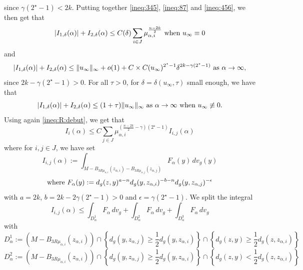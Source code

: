 \documentclass[reqno]{amsart}
\def \eps {\epsilon}
\def \crit {2^\star}
\def \mai {\mu_{\alpha,i}}
\def \maj {\mu_{\alpha,j}}
\def \zai {z_{\alpha,i}}
\def \zaj {z_{\alpha,j}}
\begin{document}
since $\gamma(\crit-1)<2k$. Putting together \eqref{ineq:345}, \eqref{ineq:87} and \eqref{ineq:456}, we then get that
\begin{equation}\label{ineq:sup:1}
\left|I_{1,\delta}(\alpha)\right|+I_{2,\delta}(\alpha)\leq C(\delta) \sum_{i\in J}\mai^{\frac{n-2k}{2}}\hbox{ when }u_\infty\equiv 0
\end{equation}
and 
\begin{equation*}
\left|I_{1,\delta}(\alpha)\right|+I_{2,\delta}(\alpha)\leq \Vert u_\infty\Vert_\infty+o(1)+C\times C( u_\infty )^{\crit-1}  \delta^{2k-\gamma(\crit-1)}\hbox{ as }\alpha\to \infty,
\end{equation*}
since $2k-\gamma(\crit-1)>0$. For all $\tau>0$, for $\delta=\delta(u_\infty,\tau)$ small enough, we have that
\begin{equation}\label{ineq:sup:2}
\left|I_{1,\delta}(\alpha)\right|+I_{2,\delta}(\alpha)\leq (1+\tau)\Vert u_\infty\Vert_\infty\hbox{ as }\alpha\to \infty\hbox{ when }u_\infty\not\equiv 0.
\end{equation}
Using again \eqref{ineq:R:debut}, we get that
\begin{equation}\label{ineq:III}
I_i(\alpha)\leq C\sum_{j\in J}\mai^{ (\frac{n-2k}{2}-\gamma )(\crit-1)}I_{i,j}(\alpha)
\end{equation}
where  for $i,j\in J$, we have set
\begin{equation}\label{def:I:ij}
I_{i,j}(\alpha):=\int_{M-B_{3R\mai}(\zai)- B_{3R\maj}(\zaj)}F_\alpha(y)\, dv_g(y)
\end{equation}
$$\hbox{where }F_\alpha(y):=d_g(z,y)^{a-n}d_g(y,\zai)^{-b-n}d_g(y,\zaj)^{-\eps}$$
with $a=2k$, $b=2k-2\gamma(\crit-1)>0$ and $\eps=\gamma(\crit-1)$. We split the integral
\begin{equation*}
I_{i,j}(\alpha)\leq \int_{D_\alpha^1}F_\alpha \, dv_g+ \int_{D_\alpha^2}F_\alpha \, dv_g+ \int_{D_\alpha^3}F_\alpha \, dv_g
\end{equation*}
with
$$D_\alpha^1:=\left(M-B_{3R\mai}(\zai) \right)\cap \left\{d_g(y,\zaj)\geq\frac{1}{2}d_g(y,\zai)\right\}\cap \left\{d_g(z,y)\geq\frac{1}{2}d_g(z,\zai)\right\}$$
$$D_\alpha^2:=\left(M-B_{3R\mai}(\zai) \right)\cap \left\{d_g(y,\zaj)\geq\frac{1}{2}d_g(y,\zai)\right\}\cap \left\{d_g(z,y)<\frac{1}{2}d_g(z,\zai)\right\}$$
\end{document}
